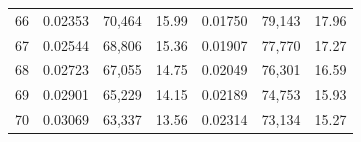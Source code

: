 \begin{tabular}{cccc|ccc}
66   & 0.02353                                                          & 70,464                                                                                            & 15.99                                                                                                                      & 0.01750                                                          & 79,143                                                                                            & 17.96                                                                                                                      \\
67   & 0.02544                                                          & 68,806                                                                                            & 15.36                                                                                                                      & 0.01907                                                          & 77,770                                                                                            & 17.27                                                                                                                      \\
68   & 0.02723                                                          & 67,055                                                                                            & 14.75                                                                                                                      & 0.02049                                                          & 76,301                                                                                            & 16.59                                                                                                                      \\
69   & 0.02901                                                          & 65,229                                                                                            & 14.15                                                                                                                      & 0.02189                                                          & 74,753                                                                                            & 15.93                                                                                                                      \\
70   & 0.03069                                                          & 63,337                                                                                            & 13.56                                                                                                                      & 0.02314                                                          & 73,134                                                                                            & 15.27                                                                                                                      \\

\end{tabular}
